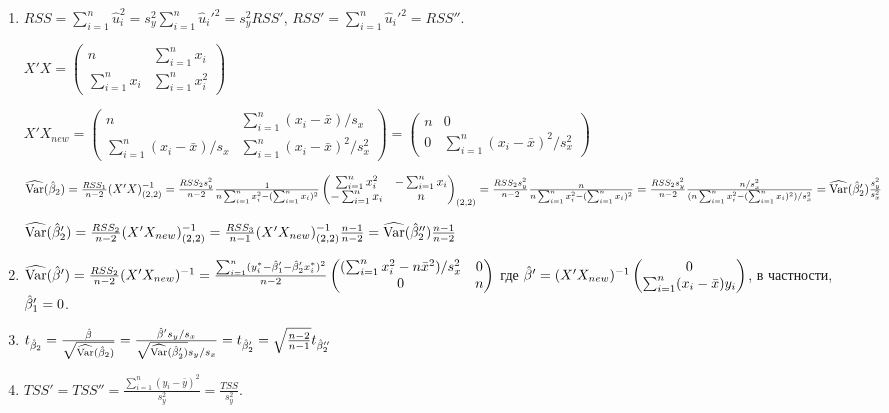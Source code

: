 \begin{problem}
\begin{sol}
\begin{enumerate}
\item $RSS=\sum_{i=1}^n \hat u_i^2=s_y^2\sum_{i=1}^n \hat u_i'^2=s_y^2RSS'$, $RSS'=\sum_{i=1}^n \hat u_i'^2=RSS''$.

$X'X=\begin{pmatrix}
n&\sum^n_{i=1}x_i\\
\sum^n_{i=1}x_i&\sum^n_{i=1}x_i^2
\end{pmatrix}$

$X'X_{new}=\begin{pmatrix}
n                            & \sum^n_{i=1}(x_i-\bar x)/s_x\\
\sum^n_{i=1}(x_i-\bar x)/s_x & \sum^n_{i=1}(x_i-\bar x)^2/s_x^2
\end{pmatrix}=
\begin{pmatrix}
n   & 0  \\
0   & \sum^n_{i=1}(x_i-\bar x)^2/s_x^2
\end{pmatrix}$

$\widehat{\operatorname{Var}}(\hat{\beta}_2)=\frac{RSS_1}{n-2}(X'X)_{(2,2)}^{-1}=\frac{RSS_2s_y^2}{n-2}\frac{1}{n\sum^n_{i=1}x_i^2-(\sum^n_{i=1}x_i)^2}
\begin{pmatrix}
\sum^n_{i=1}x_i^2&-\sum^n_{i=1}x_i\\
-\sum^n_{i=1}x_i&n
\end{pmatrix}_{(2,2)}=\frac{RSS_2s_y^2}{n-2}\frac{n}{n\sum^n_{i=1}x_i^2-(\sum^n_{i=1}x_i)^2}=\frac{RSS_2s_y^2}{n-2}\frac{n/s_x^2}{(n\sum^n_{i=1}x_i^2-(\sum^n_{i=1}x_i)^2)/s_x^2}=\widehat{\operatorname{Var}}(\hat{\beta}_2')\frac{s_y^2}{s_x^2}$

$\widehat{\operatorname{Var}}(\hat{\beta}'_2)=\frac{RSS_2}{n-2}(X'X_{new})_{(2,2)}^{-1}=\frac{RSS_3}{n-1}(X'X_{new})_{(2,2)}^{-1}\frac{n-1}{n-2}=\widehat{\operatorname{Var}}(\hat{\beta}''_2)\frac{n-1}{n-2}$

\item $\widehat{\operatorname{Var}}(\hat{\beta}')=\frac{RSS_2}{n-2}(X'X_{new})^{-1}=\frac{\sum_{i=1}^n(y_i^*-\hat{\beta}_1'-\hat{\beta}_2'x_i^*)^2}{n-2}\begin{pmatrix}
(\sum^n_{i=1}x_i^2-n\bar x^2)/s_x^2&0\\
0&n
\end{pmatrix}$
где $\hat{\beta}'=(X'X_{new})^{-1}\begin{pmatrix}
0\\
\sum_{i=1}^n(x_i-\bar x)y_i
\end{pmatrix}$, в частности, $\hat{\beta}_1'=0$.

\item $t_{\hat{\beta}_2}=\frac{\hat\beta}{\sqrt{\widehat{\operatorname{Var}}(\hat{\beta}_2)}}=\frac{\hat\beta's_y/s_x}{\sqrt{\widehat{\operatorname{Var}}(\hat{\beta}_2')}s_y/s_x}=t_{\hat{\beta}_2'}=\sqrt{\frac{n-2}{n-1}}t_{\hat{\beta}_2''}$

\item $TSS'=TSS''=\frac{\sum_{i=1}^n(y_i-\bar y)^2}{s_y^2}=\frac{TSS}{s_y^2}$.


\end{enumerate}
\end{sol}
\end{problem}

